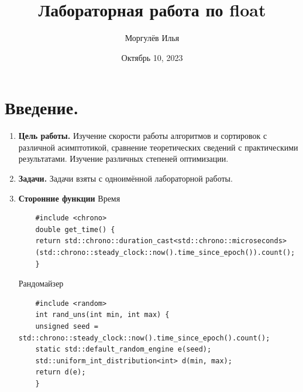 \documentclass[a4paper, 12pt]{article}
\title{\textbf{Лабораторная работа по float}}
\author{Моргулёв Илья}
\date{Октябрь 10, 2023}
\begin{document}
    \maketitle

    \section{Введение.}
        \begin{enumerate}
            \item \textbf{Цель работы.}
            Изучение скорости работы алгоритмов и сортировок с различной асимптотикой, сравнение теоретических сведений с практическими результатами. Изучение различных степеней оптимизации.
            \item \textbf{Задачи.}
            Задачи взяты с одноимённой лабораторной работы.
            \item \textbf{Сторонние функции} \newline
        Время
        \begin{lstlisting}
    #include <chrono>
    double get_time() {
    return std::chrono::duration_cast<std::chrono::microseconds>
    (std::chrono::steady_clock::now().time_since_epoch()).count();
    }
        \end{lstlisting}
        Рандомайзер
        \begin{lstlisting}
    #include <random>
    int rand_uns(int min, int max) {
    unsigned seed = std::chrono::steady_clock::now().time_since_epoch().count();
    static std::default_random_engine e(seed);
    std::uniform_int_distribution<int> d(min, max);
    return d(e);
    }
        \end{lstlisting}
        \end{enumerate}
\end{document}
